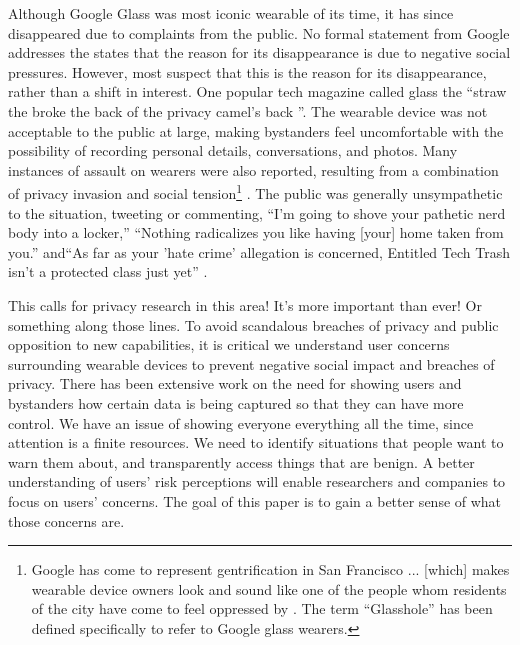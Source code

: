 Although Google Glass was most iconic wearable of its time, it has since disappeared due to complaints from the public\cite{13_google_2015}. No formal statement from Google addresses the states that the reason for its disappearance is due to negative social pressures. However, most suspect that this is the reason for its disappearance, rather than a shift in interest. One popular tech magazine called glass the ``straw the broke the back of the privacy camel's back \cite{14_dvorak_2014}''. The wearable device was not acceptable to the public at large, making bystanders feel uncomfortable with the possibility of recording personal details, conversations, and photos. Many instances of assault \cite{1_russell_2014, 15_mashable_2014, 16_gross_2014} on wearers were also reported, resulting from a combination of privacy invasion and social tension\footnote{Google has come to represent gentrification in San Francisco ... [which] makes wearable device owners look and sound like one of the people whom residents of the city have come to feel oppressed by \cite{17_matyszczyk_2014}. The term ``Glasshole'' \cite{18_google_2015} has been defined specifically to refer to Google glass wearers.} . The public was generally unsympathetic to the situation, tweeting or commenting, ``I'm going to shove your pathetic nerd body into a locker,'' ``Nothing radicalizes you like having [your] home taken from you.'' and``As far as your 'hate crime' allegation is concerned, Entitled Tech Trash isn't a protected class just yet'' \cite{1_russell_2014,15_mashable_2014}.

{\color {red} This calls for privacy research in this area! It's more important than ever! Or something along those lines.}  To avoid scandalous breaches of privacy and public opposition to new capabilities, it is critical we understand user concerns surrounding wearable devices to prevent negative social impact and breaches of privacy. There has been extensive work on the need for showing users and bystanders how certain data is being captured so that they can have more control. We have an issue of showing everyone everything all the time, since attention is a finite resources. We need to identify situations that people want to warn them about, and transparently access things that are benign. A better understanding of users' risk perceptions will enable researchers and companies to focus on users' concerns. The goal of this paper is to gain a better sense of what those concerns are. 

